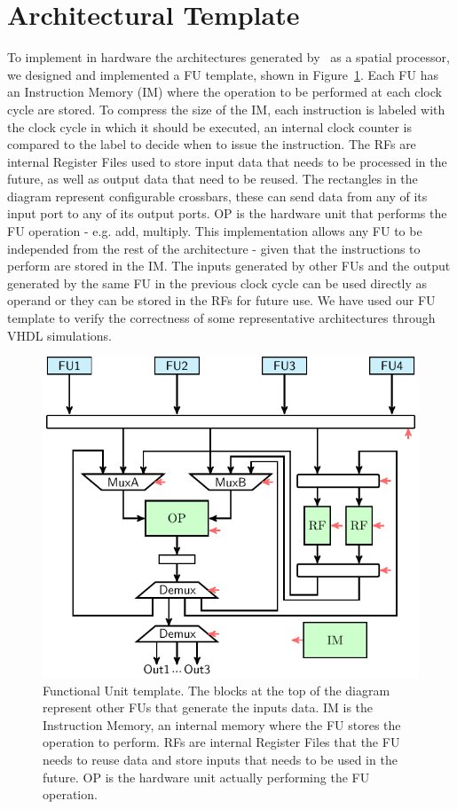 \section{Architectural Template}
\label{sec:arch_template}
To implement in hardware the architectures generated by \frameworkname~as a spatial processor, we designed and implemented a FU template, shown in Figure~\ref{fig:FU_templ}. Each FU has an Instruction Memory (IM) where the operation to be performed at each clock cycle are stored. To compress the size of the IM, each instruction is labeled with the clock cycle in which it should be executed, an internal clock counter is compared to the label to decide when to issue the instruction. The RFs are internal Register Files used to store input data that needs to be processed in the future, as well as output data that need to be reused. The rectangles in the diagram represent configurable crossbars, these can send data from any of its input port to any of its output ports. OP is the hardware unit that performs the FU operation - e.g. add, multiply. This implementation allows any FU to be independed from the rest of the architecture - given that the instructions to perform are stored in the IM. The inputs generated by other FUs and the output generated by the same FU in the previous clock cycle can be used directly as operand or they can be stored in the RFs for future use. 
We have used our FU template to verify the correctness of some representative architectures through VHDL simulations.

\begin{figure}[tb] 
\centering
\includegraphics[width=.9\columnwidth,left]{images/functional_unit.pdf}
    \caption{\small Functional Unit template. The blocks at the top of the diagram represent other FUs that generate the inputs data. IM is the Instruction Memory, an internal memory where the FU stores the operation to perform. RFs are internal Register Files that the FU needs to reuse data and store inputs that needs to be used in the future. OP is the hardware unit actually performing the FU operation.}
\label{fig:FU_templ}
\end{figure}

